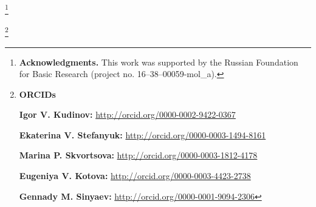 \renewcommand{\baselinestretch}{0.75}



\RuDate



\newpage



\makeentitle





\thanks{{\bf Acknowledgments.} This work was supported by the Russian Foundation for Basic Research (project no. 16--38--00059-mol\_a).}





\thanks{{\bf ORCIDs}





{\bf Igor V. Kudinov:} \url{http://orcid.org/0000-0002-9422-0367}



{\bf  Ekaterina V. Stefanyuk:} \url{http://orcid.org/0000-0003-1494-8161}



{\bf  Marina P. Skvortsova:} \url{http://orcid.org/0000-0003-1812-4178}



{\bf Eugeniya V. Kotova:} \url{http://orcid.org/0000-0003-4423-2738}



{\bf Gennady M. Sinyaev:} \url{http://orcid.org/0000-0001-9094-2306}





}





\EngRef



